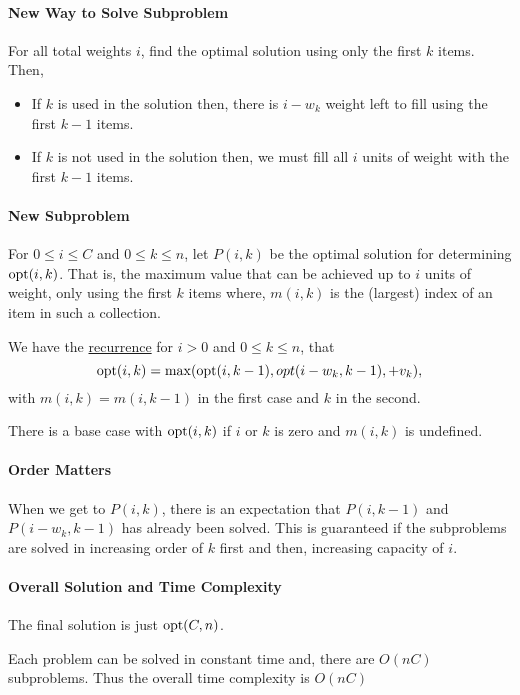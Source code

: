 \paragraph{New Way to Solve Subproblem}
For all total weights \(i\), find the optimal solution using only the first \(k\) items.
Then,
\begin{itemize}
  \item If \(k\) is used in the solution then, there is \(i - w_k\) weight left
    to fill using the first \( k - 1 \) items.
  \item If \(k\) is not used in the solution then, we must fill all  \(i\)
    units of weight with the first  \(k - 1\) items.
\end{itemize}

\paragraph{New Subproblem}
For \(0 \leq i \leq C\) and \(0 \leq k \leq n\), let  \(P(i, k)\) be the optimal
solution for determining  \(\mathrm{opt}(i, k)\). That is, the maximum value that can be achieved
up to  \(i\) units of weight, only using the first \(k\) items where, \(m(i, k)\) is the
(largest) index of an item in such a collection.

We have the \underline{recurrence} for \(i > 0\) and \(0 \leq k \leq n\), that  \[
  \mathrm{opt}(i, k) = \max (\mathrm{opt}(i, k - 1), opt(i - w_k, k - 1), + v_k),
\] with \(m(i, k) = m(i, k - 1)\) in the first case and \(k\) in the second.

There is a base case with \(\mathrm{opt}(i, k)\) if  \(i\) or \(k\) is zero and  \(m(i, k)\)
is undefined.

\paragraph{Order Matters}
When we get to \(P(i, k)\), there is an expectation that  \(P(i, k - 1)\)
and  \(P(i - w_k, k - 1)\) has already been solved.
This is guaranteed if the subproblems are solved in increasing order of \(k\)
first and then, increasing capacity of \(i\). 

\paragraph{Overall Solution and Time Complexity}
The final solution is just \(\mathrm{opt}(C, n)\). 

Each problem can be solved in constant time and, there are \(O(nC)\)
subproblems. Thus the overall time complexity is  \(O(nC)\)


